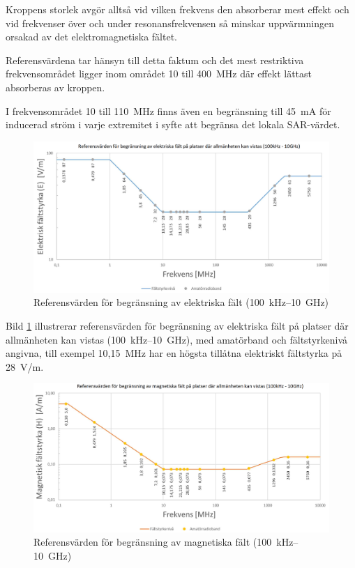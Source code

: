 Kroppens storlek avgör alltså vid vilken frekvens den absorberar mest effekt och
vid frekvenser över och under resonansfrekvensen så minskar uppvärmningen
orsakad av det elektromagnetiska fältet.

Referensvärdena tar hänsyn till detta faktum och det mest restriktiva
frekvensområdet ligger inom området 10 till 400~MHz där effekt lättast
absorberas av kroppen.

I frekvensområdet 10 till 110~MHz finns även en begränsning till 45~mA för
inducerad ström i varje extremitet i syfte att begränsa det lokala SAR-värdet.

\begin{figure}[htb]
	\begin{center}
		\includegraphics[width=13cm]{images/emfbild-000}
		\caption{Referensvärden för begränsning av elektriska fält (100~kHz--10~GHz)}
		\label{fig:emf1}
	\end{center}
\end{figure}

Bild \ref{fig:emf1} illustrerar referensvärden för begränsning av elektriska
fält på platser där allmänheten kan vistas (100~kHz--10~GHz), med amatörband
och fältstyrkenivå angivna, till exempel 10,15~MHz har en högsta tillåtna
elektriskt fältstyrka på 28~V/m.

\begin{figure}[htb]
	\begin{center}
		\includegraphics[width=13cm]{images/emfbild-001}
		\caption{Referensvärden för begränsning av magnetiska fält (100~kHz--10~GHz)}
		\label{fig:emf2}
	\end{center}
\end{figure}

